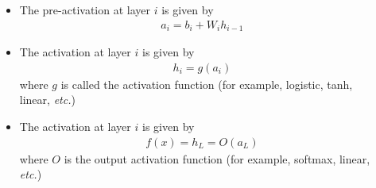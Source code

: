 \begin{frame}
  \begin{columns}
    \begin{overlayarea}{\textwidth}{\textheight}
      \makebox[\textwidth][c]{\usebox{\nncontent}}
    \end{overlayarea}

    \begin{overlayarea}{\textwidth}{\textheight}
      \begin{itemize}
        \justifying
        \item The pre-activation at layer $i$ is given by
            \begin{align*}
              a_i = b_i + W_i h_{i-1}
            \end{align*}
        \item The activation at layer $i$ is given by
            \begin{align*}
              h_i = g(a_i)
            \end{align*}
            where $g$ is called the activation function (for example, logistic, tanh, linear, \textit{etc.})
        \item The activation at layer $i$ is given by
            \begin{align*}
              f(x) = h_{L} = O(a_{L})
            \end{align*}
            where $O$ is the output activation function (for example, softmax, linear, \textit{etc.})
      \end{itemize}
    \end{overlayarea}

  \end{columns}
\end{frame}

